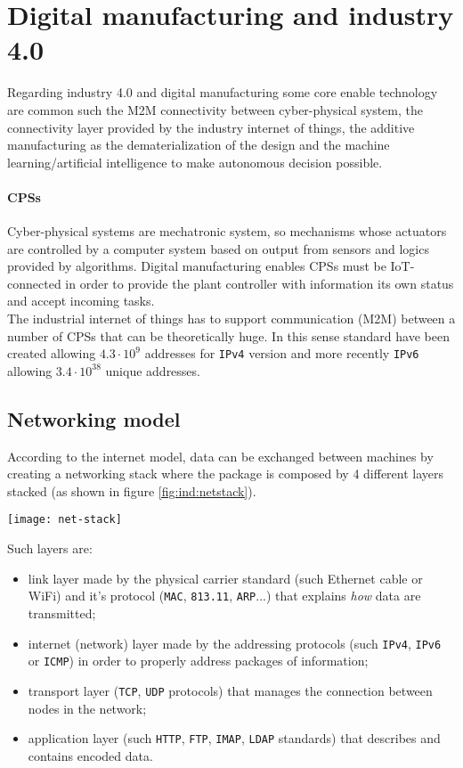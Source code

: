 \section*{Digital manufacturing and industry 4.0} 
	Regarding industry 4.0 and digital manufacturing some core enable technology are common such the M2M connectivity between cyber-physical system, the connectivity layer provided by the industry internet of things, the additive manufacturing as the dematerialization of the design and the machine learning/artificial intelligence to make autonomous decision possible.
	
	\paragraph{CPSs} Cyber-physical systems are mechatronic system, so mechanisms whose actuators are controlled by a computer system based on output from sensors and logics provided by algorithms. Digital manufacturing enables CPSs must be IoT-connected in order to provide the plant controller with information its own status and accept incoming tasks. \\
	The industrial internet of things has to support communication (M2M) between a number of CPSs that can be theoretically huge. In this sense  standard have been created allowing $4.3\cdot 10^9$ addresses for \texttt{IPv4} version and more recently \texttt{IPv6} allowing $3.4\cdot 10^{38}$ unique addresses.
	
	\subsection*{Networking model}
		According to the internet model, data can be exchanged between machines by creating a networking stack where the package is composed by 4 different layers stacked (as shown in figure \ref{fig:ind:netstack}).
		\begin{SCfigure}[2][b]
			\centering \texttt{[image: net-stack]}
			\caption{4 layers and related package constitution used for communication using internet protocols.} \label{fig:ind:netstack}
		\end{SCfigure}
		Such layers are:
		\begin{itemize}
			\item[\texttt{L1})] link layer made by the physical carrier standard (such Ethernet cable or WiFi) and it's protocol (\texttt{MAC}, \texttt{813.11}, \texttt{ARP}...) that explains \textit{how} data are transmitted;
			\item[\texttt{L2})] internet (network) layer made by the addressing protocols (such \texttt{IPv4}, \texttt{IPv6} or \texttt{ICMP}) in order to properly address packages of information;
			\item[\texttt{L3})] transport layer (\texttt{TCP}, \texttt{UDP} protocols) that manages the connection between nodes in the network;
			\item[\texttt{L4})] application layer (such \texttt{HTTP}, \texttt{FTP}, \texttt{IMAP}, \texttt{LDAP} standards) that describes and contains encoded data.
		\end{itemize}
	
